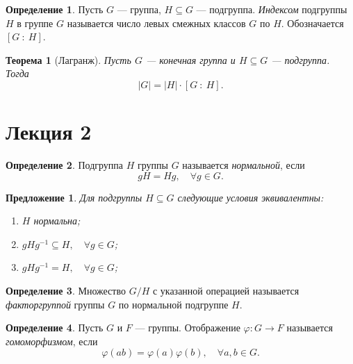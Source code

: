 \documentclass[a4paper]{article}
\theoremstyle{plain}
\newtheorem*{theorem}{Теорема}
\newtheorem{proposal}{Предложение}
\theoremstyle{definition}
\newtheorem{definition}{Определение}
\numberwithin{definition}{section}
\numberwithin{proposal}{section}
\begin{document}
\begin{definition}
Пусть \(G\) --- группа, \(H \subseteq G\) --- подгруппа. \emph{Индексом} подгруппы \(H\) в группе \(G\) называется число левых смежных классов \(G\) по \(H\). Обозначается \([G \::\: H]\).
\end{definition}

\begin{theorem}[Лагранж]
Пусть \(G\) --- конечная группа и \(H \subseteq G\) --- подгруппа. Тогда
\begin{equation*}
	|G| = |H| \cdot [G \::\: H].
\end{equation*}
\end{theorem}


\section{Лекция 2}

\begin{definition}
Подгруппа \(H\) группы \(G\) называется \emph{нормальной}, если
\begin{equation*}
 	gH = Hg, \quad \forall g \in G.
\end{equation*} 
\end{definition}

\begin{proposal}
Для подгруппы \(H \subseteq G\) следующие условия эквивалентны:
\begin{enumerate}
	\item \(H\) нормальна;
	\item \(gHg^{-1} \subseteq H, \quad \forall g \in G\);
	\item \(gHg^{-1} = H, \quad \forall g \in G\);
\end{enumerate}
\end{proposal}

\begin{definition}
Множество \(G / H\) с указанной операцией называется \emph{факторгруппой} группы \(G\) по нормальной подгруппе \(H\).
\end{definition}

\begin{definition}
Пусть \(G\) и \(F\) --- группы. Отображение \(\varphi: G \rightarrow F\) называется \emph{гомоморфизмом}, если
\begin{equation*}
	\varphi(ab) = \varphi(a)\varphi(b), \quad \forall a, b \in G.
\end{equation*}
\end{definition}
\end{document}
